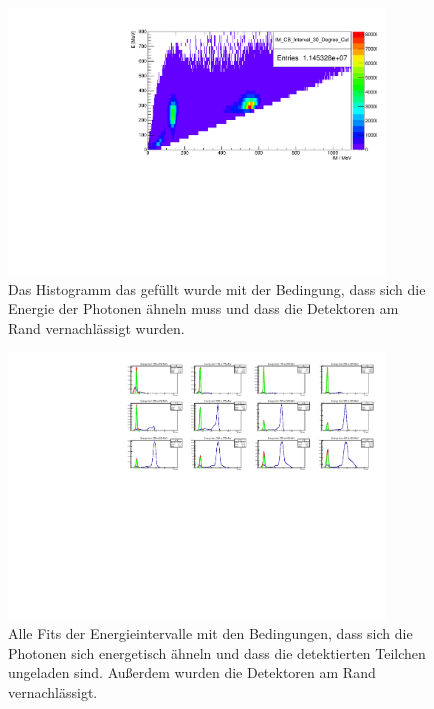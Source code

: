 \documentclass[a4paper,11pt,oneside,final,german,openbib,pdftex]{scrbook}
\begin{document}
{\begin{appendix}
\begin{figure}[h!]
	\begin{center}
		\includegraphics[width=100mm]{NewCalib/Strahlzeit2014/20171904Real30DegreeCutHist}
		\caption{Das Histogramm das gef\"ullt wurde mit der Bedingung, dass sich die Energie der Photonen \"ahneln muss und dass die Detektoren am Rand vernachl\"assigt wurden.}
		\label{fig:30-Degree-Cut-Histogramm}
	\end{center}
\end{figure}


\begin{figure}[h!]
	\begin{center}
		\includegraphics[width=100mm]{NewCalib/Strahlzeit2014/20171904Real30DegreeCutAllFits}
		\caption{Alle Fits der Energieintervalle mit den Bedingungen, dass sich die Photonen sich energetisch ähneln und dass die detektierten Teilchen ungeladen sind. Au{\ss}erdem wurden die Detektoren am Rand vernachl\"assigt.}
		\label{fig:30-Degree-Cut-RealData-All-Fits}
	\end{center}
\end{figure}







\end{appendix}}
\end{document}

